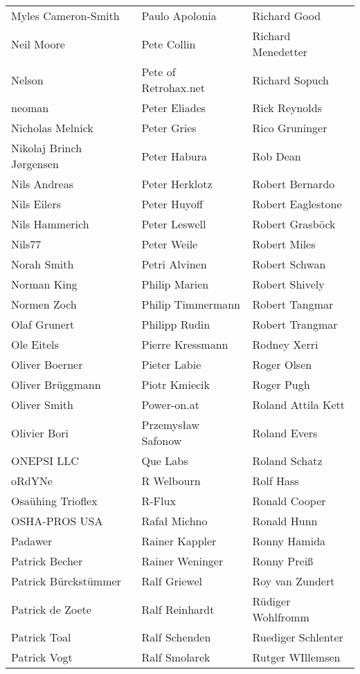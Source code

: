 \begin{tabular}{p{4.5cm}p{4.5cm}p{4.5cm}}
Myles Cameron-Smith & Paulo Apolonia & Richard Good \\
Neil Moore & Pete Collin & Richard Menedetter \\
Nelson & Pete of Retrohax.net & Richard Sopuch \\
neoman & Peter Eliades & Rick Reynolds \\
Nicholas Melnick & Peter Gries & Rico Gruninger \\
Nikolaj Brinch Jørgensen & Peter Habura & Rob Dean \\
Nils Andreas & Peter Herklotz & Robert Bernardo \\
Nils Eilers & Peter Huyoff & Robert Eaglestone \\
Nils Hammerich & Peter Leswell & Robert Grasböck \\
Nils77 & Peter Weile & Robert Miles \\
Norah Smith & Petri Alvinen & Robert Schwan \\
Norman King & Philip Marien & Robert Shively \\
Normen Zoch & Philip Timmermann & Robert Tangmar \\
Olaf Grunert & Philipp Rudin & Robert Trangmar \\
Ole Eitels & Pierre Kressmann & Rodney Xerri \\
Oliver Boerner & Pieter Labie & Roger Olsen \\
Oliver Brüggmann & Piotr Kmiecik & Roger Pugh \\
Oliver Smith & Power-on.at & Roland Attila Kett \\
Olivier Bori & Przemysław Safonow & Roland Evers \\
ONEPSI LLC & Que Labs & Roland Schatz \\
oRdYNe & R Welbourn & Rolf Hass \\
Osaühing Trioflex & R-Flux & Ronald Cooper \\
OSHA-PROS USA & Rafał Michno & Ronald Hunn \\
Padawer & Rainer Kappler & Ronny Hamida \\
Patrick Becher & Rainer Weninger & Ronny Preiß \\
Patrick Bürckstümmer & Ralf Griewel & Roy van Zundert \\
Patrick de Zoete & Ralf Reinhardt & Rüdiger Wohlfromm \\
Patrick Toal & Ralf Schenden & Ruediger Schlenter \\
Patrick Vogt & Ralf Smolarek & Rutger WIllemsen \\

\end{tabular}
